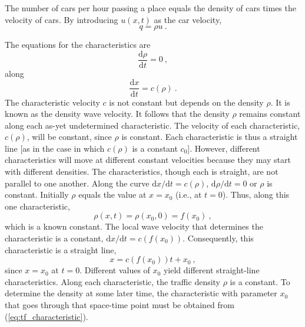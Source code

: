 \documentclass[12pt,a4paper]{article}
\newcommand{\dif}{\mathrm{d}}
\begin{document}
The number of cars per hour passing a place equals the density of cars times the velocity of cars. By introducing $u(x, t)$ as the car velocity, 
\begin{equation}
q = \rho u ~.
\end{equation}



The equations for the characteristics are
\begin{equation}
\dfrac{\dif \rho}{\dif t} = 0 ~,
\end{equation}
along
\begin{equation}
\dfrac{\dif x}{\dif t} = c(\rho) ~.
\end{equation}
The characteristic velocity $c$ is not constant but depends on the density $\rho$. It is known as the density wave velocity. It follows that the density $\rho$ remains constant along each as-yet undetermined characteristic. The velocity of each characteristic, $c(\rho)$, will be constant, since $\rho$ is constant. Each characteristic is thus a straight line [as in the case in which $c(\rho)$ is a constant $c_0$]. However, different characteristics will move at different constant velocities because they may start with different densities. The characteristics, though each is straight, are not parallel to one another. Along the curve $\dif x/\dif t = c(\rho)$, $\dif \rho/\dif t = 0$ or $\rho$ is constant. Initially $\rho$ equals the value at $x = x_0$ (i.e., at $t = 0$). Thus, along this one characteristic,
\begin{equation}
\rho(x, t) = \rho(x_0, 0) = f(x_0) ~,
\end{equation}
which is a known constant. The local wave velocity that determines the characteristic is a constant, $\dif x/\dif t = c(f(x_0))$. Consequently, this characteristic is a straight line,
\begin{equation}
x = c(f(x_0)) t + x_0 ~,
\label{eq:tf_characteristic}
\end{equation}
since $x = x_0$ at $t = 0$. Different values of $x_0$ yield different straight-line characteristics. Along each characteristic, the traffic density $\rho$ is a constant. To determine the density at some later time, the characteristic with parameter $x_0$ that goes through that space-time point must be obtained from (\ref{eq:tf_characteristic}).
\end{document}

